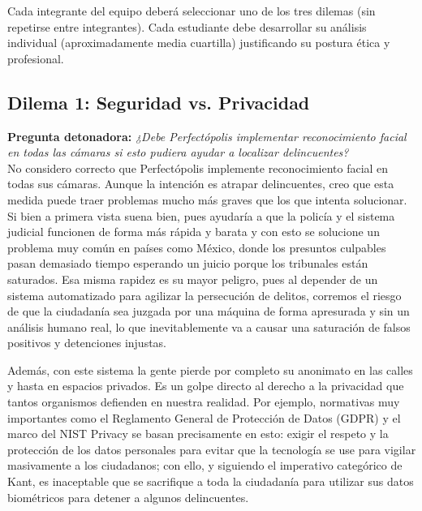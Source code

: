 
Cada integrante del equipo deberá seleccionar uno de los tres dilemas (sin repetirse entre integrantes). Cada estudiante debe desarrollar su análisis individual (aproximadamente media cuartilla) justificando su postura ética y profesional.

\subsection*{Dilema 1: Seguridad vs. Privacidad}
\textbf{Pregunta detonadora:} \textit{¿Debe Perfectópolis implementar reconocimiento facial en todas las cámaras si esto pudiera ayudar a localizar delincuentes?}\\[2mm]    
No considero correcto que Perfectópolis implemente reconocimiento facial en todas sus cámaras. Aunque la intención es atrapar delincuentes, creo que esta medida puede traer problemas mucho más graves que los que intenta solucionar. Si bien a primera vista suena bien, pues ayudaría a que la policía y el sistema judicial funcionen de forma más rápida y barata y con esto se solucione un problema muy común en países como México, donde los presuntos culpables pasan demasiado tiempo esperando un juicio porque los tribunales están saturados. Esa misma rapidez es su mayor peligro, pues al depender de un sistema automatizado para agilizar la persecución de delitos, corremos el riesgo de que la ciudadanía sea juzgada por una máquina de forma apresurada y sin un análisis humano real, lo que inevitablemente va a causar una saturación de falsos positivos y detenciones injustas.

Además, con este sistema la gente pierde por completo su anonimato en las calles y hasta en espacios privados. Es un golpe directo al derecho a la privacidad que tantos organismos defienden en nuestra realidad. Por ejemplo, normativas muy importantes como el Reglamento General de Protección de Datos (GDPR) \cite{eu_gdpr_2016} y el marco del NIST Privacy \cite{boeckl2020nist} se basan precisamente en esto: exigir el respeto y la protección de los datos personales para evitar que la tecnología se use para vigilar masivamente a los ciudadanos; con ello, y siguiendo el imperativo categórico de Kant, es inaceptable que se sacrifique a toda la ciudadanía para utilizar sus datos biométricos para detener a algunos delincuentes.

